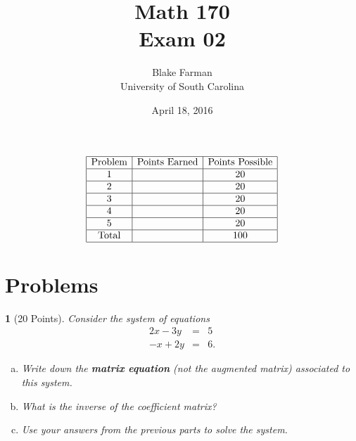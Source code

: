 \documentclass[12pt]{amsart}
\author{Blake Farman\\University of South Carolina}
\title{Math 170\\Exam 02}
\date{April 18, 2016}
\begin{document}
\maketitle

\begin{center}
\end{center}

\vspace{0.2in}
\vspace{0.2in}

\theoremstyle{plain}
\newtheorem{thm}{}
\newtheorem{lem}{Lemma}
\theoremstyle{definition}
\newtheorem{defn}{Definition}
$$
\begin{array}{|c|c|c|}
  \hline
  \text{Problem} & \text{Points Earned} & \text{Points Possible}\\
  \hline
  1 & & 20\\
  \hline
  2 & & 20\\
  \hline
  3 & & 20\\
  \hline
  4 & & 20\\
  \hline
  5 & & 20 \\
  \hline
  \text{Total} & & 100\\
  \hline
\end{array}
$$

\newpage

\section{Problems}

\begin{thm}[20 Points]\label{ex1}
  Consider the system of equations
  \begin{eqnarray*}
    2x - 3y &=& 5\\
    -x + 2y &=& 6.
  \end{eqnarray*}
  \begin{enumerate}[(a)]
  \item\label{1.a}
    Write down the {\bf matrix equation} (not the augmented matrix) associated to this system.
    \vspace{1.5in}
  \item
    What is the inverse of the coefficient matrix?
    \vspace{2in}
  \item
    Use your answers from the previous parts to solve the system.
  \end{enumerate}
\end{thm}
\end{document}
